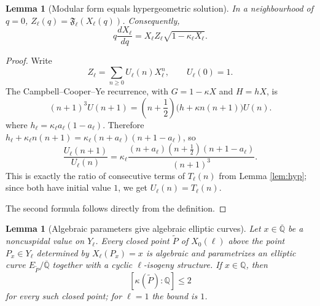 \documentclass[11pt,a4paper]{amsart} %
\newtheorem{lemma}[theorem]{Lemma}
\theoremstyle{definition}
\newcommand{\Q}{\mathbb Q}
\newcommand{\Qbar}{\overline{\mathbb Q}}
\begin{document}
\begin{lemma}[Modular form equals hypergeometric solution]\label{lem:ZF}
    In a neighbourhood of \(q=0\), $Z_\ell(q)={\mathfrak F}_\ell(X_\ell(q))$. Consequently, \[q\frac{dX_\ell}{dq}=X_\ell Z_\ell\sqrt{1-\kappa_\ell X_\ell}.\]
\end{lemma}

\begin{proof}
Write
\[
Z_\ell=\sum_{n\ge0}U_\ell(n)X_\ell^n,\qquad U_\ell(0)=1.
\]
The Campbell--Cooper--Ye recurrence, with \(G=1-\kappa X\) and \(H=hX\), is
\[
(n+1)^3U(n+1)
=\left(n+\frac12\right)
\bigl(h+\kappa n(n+1)\bigr)U(n).
\]
where \(h_\ell=\kappa_\ell a_\ell(1-a_\ell)\). Therefore $h_\ell+\kappa_\ell n(n+1)=\kappa_\ell(n+a_\ell)(n+1-a_\ell)$, so
\[
\frac{U_\ell(n+1)}{U_\ell(n)}
=\kappa_\ell
\frac{(n+a_\ell)(n+\frac12)(n+1-a_\ell)}
{(n+1)^3}.
\]
This is exactly the ratio of consecutive terms of \(T_\ell(n)\) from Lemma \ref{lem:hyp}; since both have initial value \(1\), we get \(U_\ell(n)=T_\ell(n)\).

The second formula follows directly from the definition.
\end{proof}

\begin{lemma}[Algebraic parameters give algebraic elliptic curves]\label{lem:algE}
Let \(x\in\Qbar\) be a noncuspidal value on \(Y_\ell\). Every closed point
\(\widetilde P\) of \(X_0(\ell)\) above the point \(P_x\in Y_\ell\) determined
by \(X_\ell(P_x)=x\) is algebraic and parametrizes an elliptic curve
\(E_{\widetilde P}/\Qbar\) together with a cyclic \(\ell\)-isogeny structure.
If \(x\in\Q\), then
\[
[\kappa(\widetilde P):\Q]\le2
\]
for every such closed point; for \(\ell=1\) the bound is \(1\).
\end{lemma}
\end{document}
